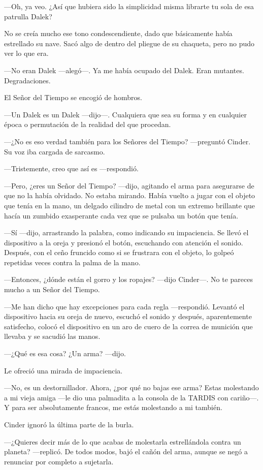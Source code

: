 —Oh, ya veo. ¿Así que hubiera sido la simplicidad misma librarte tu sola de esa patrulla Dalek? 

No se creía mucho ese tono condescendiente, dado que básicamente había estrellado su nave. Sacó algo de dentro del pliegue de su chaqueta, pero no pudo ver lo que era. 

—No eran Dalek —alegó—. Ya me había ocupado del Dalek. Eran mutantes. Degradaciones. 

El Señor del Tiempo se encogió de hombros. 

—Un Dalek es un Dalek —dijo—. Cualquiera que sea su forma y en cualquier época o permutación de la realidad del que procedan. 

—¿No es eso verdad también para los Señores del Tiempo? —preguntó Cinder. Su voz iba cargada de sarcasmo. 

—Tristemente, creo que así es —respondió. 

—Pero, ¿eres un Señor del Tiempo? —dijo, agitando el arma para asegurarse de que no la había olvidado. No estaba mirando. Había vuelto a jugar con el objeto que tenía en la mano, un delgado cilindro de metal con un extremo brillante que hacía un zumbido exasperante cada vez que se pulsaba un botón que tenía. 

—Sí —dijo, arrastrando la palabra, como indicando su impaciencia. Se llevó el dispositivo a la oreja y presionó el botón, escuchando con atención el sonido. Después, con el ceño fruncido como si se frustrara con el objeto, lo golpeó repetidas veces contra la palma de la mano. 

—Entonces, ¿dónde están el gorro y los ropajes? —dijo Cinder—. No te pareces mucho a un Señor del Tiempo. 

—Me han dicho que hay excepciones para cada regla —respondió. Levantó el dispositivo hacia su oreja de nuevo, escuchó el sonido y después, aparentemente satisfecho, colocó el dispositivo en un aro de cuero de la correa de munición que llevaba y se sacudió las manos. 

—¿Qué es esa cosa? ¿Un arma? —dijo. 

Le ofreció una mirada de impaciencia. 

—No, es un destornillador. Ahora, ¿por qué no bajas ese arma? Estas molestando a mi vieja amiga —le dio una palmadita a la consola de la TARDIS con cariño—. Y para ser absolutamente francos, me estás molestando a mi también. 

Cinder ignoró la última parte de la burla. 

—¿Quieres decir más de lo que acabas de molestarla estrellándola contra un planeta? —replicó. De todos modos, bajó el cañón del arma, aunque se negó a renunciar por completo a sujetarla. 

